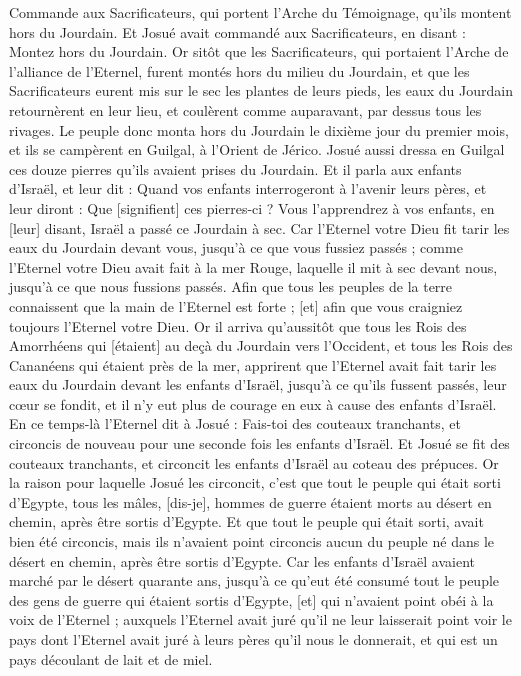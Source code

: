 \begin{multicols}{2}
Commande aux Sacrificateurs, qui portent l'Arche du Témoignage, qu'ils montent hors du Jourdain.
Et Josué avait commandé aux Sacrificateurs, en disant : Montez hors du Jourdain.
Or sitôt que les Sacrificateurs, qui portaient l'Arche de l'alliance de l'Eternel, furent montés hors du milieu du Jourdain, et que les Sacrificateurs eurent mis sur le sec les plantes de leurs pieds, les eaux du Jourdain retournèrent en leur lieu, et coulèrent comme auparavant, par dessus tous les rivages.
Le peuple donc monta hors du Jourdain le dixième jour du premier mois, et ils se campèrent en Guilgal, à l'Orient de Jérico.
Josué aussi dressa en Guilgal ces douze pierres qu'ils avaient prises du Jourdain.
Et il parla aux enfants d'Israël, et leur dit : Quand vos enfants interrogeront à l'avenir leurs pères, et leur diront : Que [signifient] ces pierres-ci ?
Vous l'apprendrez à vos enfants, en [leur] disant, Israël a passé ce Jourdain à sec.
Car l'Eternel votre Dieu fit tarir les eaux du Jourdain devant vous, jusqu'à ce que vous fussiez passés ; comme l'Eternel votre Dieu avait fait à la mer Rouge, laquelle il mit à sec devant nous, jusqu'à ce que nous fussions passés.
Afin que tous les peuples de la terre connaissent que la main de l'Eternel est forte ; [et] afin que vous craigniez toujours l'Eternel votre Dieu.
\VerseOne{}Or il arriva qu'aussitôt que tous les Rois des Amorrhéens qui [étaient] au deçà du Jourdain vers l'Occident, et tous les Rois des Cananéens qui étaient près de la mer, apprirent que l'Eternel avait fait tarir les eaux du Jourdain devant les enfants d'Israël, jusqu'à ce qu'ils fussent passés, leur cœur se fondit, et il n'y eut plus de courage en eux à cause des enfants d'Israël.
En ce temps-là l'Eternel dit à Josué : Fais-toi des couteaux tranchants, et circoncis de nouveau pour une seconde fois les enfants d'Israël.
Et Josué se fit des couteaux tranchants, et circoncit les enfants d'Israël au coteau des prépuces.
Or la raison pour laquelle Josué les circoncit, c'est que tout le peuple qui était sorti d'Egypte, tous les mâles, [dis-je], hommes de guerre étaient morts au désert en chemin, après être sortis d'Egypte.
Et que tout le peuple qui était sorti, avait bien été circoncis, mais ils n'avaient point circoncis aucun du peuple né dans le désert en chemin, après être sortis d'Egypte.
Car les enfants d'Israël avaient marché par le désert quarante ans, jusqu'à ce qu'eut été consumé tout le peuple des gens de guerre qui étaient sortis d'Egypte, [et] qui n'avaient point obéi à la voix de l'Eternel ; auxquels l'Eternel avait juré qu'il ne leur laisserait point voir le pays dont l'Eternel avait juré à leurs pères qu'il nous le donnerait, et qui est un pays découlant de lait et de miel.

\end{multicols}
